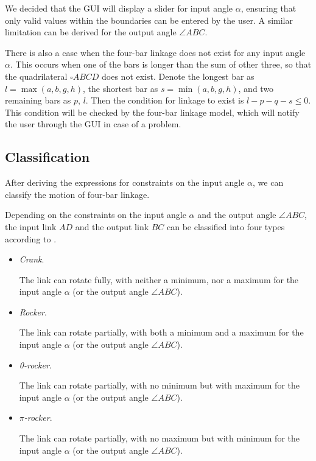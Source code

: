 \documentclass{article}
\begin{document}
 We decided that the GUI will display a slider for input angle $\alpha$, ensuring that only valid values within the boundaries can be entered by the user. A similar limitation can be derived for the output angle $\angle ABC$.
 
 There is also a case when the four-bar linkage does not exist for any input angle $\alpha$. This occurs when one of the bars is longer than the sum of other three, so that the quadrilateral $\square ABCD$ does not exist. Denote the longest bar as $l = \max(a, b, g, h)$, the shortest bar as $s = \min(a, b, g, h)$, and two remaining bars as $p$, $l$. Then the condition for linkage to exist is $l-p-q-s \le 0$. This condition will be checked by the four-bar linkage model, which will notify the user through the GUI in case of a problem.
 

 \subsection{Classification}
 
 After deriving the expressions for constraints on the input angle $\alpha$, we can classify the motion of four-bar linkage.
 
 Depending on the constraints on the input angle $\alpha$ and the output angle $\angle ABC$, the input link $AD$ and the output link $BC$ can be classified into four types according to \cite{inproceedings}.
 
 \begin{itemize}
 	\item \textit{Crank}.
 	
 	The link can rotate fully, with neither a minimum, nor a maximum for the input angle $\alpha$ (or the output angle $\angle ABC$).
 	
 	\item \textit{Rocker}.
 	
 	The link can rotate partially, with both a minimum and a maximum for the input angle $\alpha$ (or the output angle $\angle ABC$).
 	
 	\item \textit{0-rocker}.
 	
 	The link can rotate partially, with no minimum but with maximum for the input angle $\alpha$ (or the output angle $\angle ABC$).
 	
 	\item \textit{$\pi$-rocker}.
 	
 	The link can rotate partially, with no maximum but with minimum for the input angle $\alpha$ (or the output angle $\angle ABC$).
 \end{itemize}
 
\end{document}
